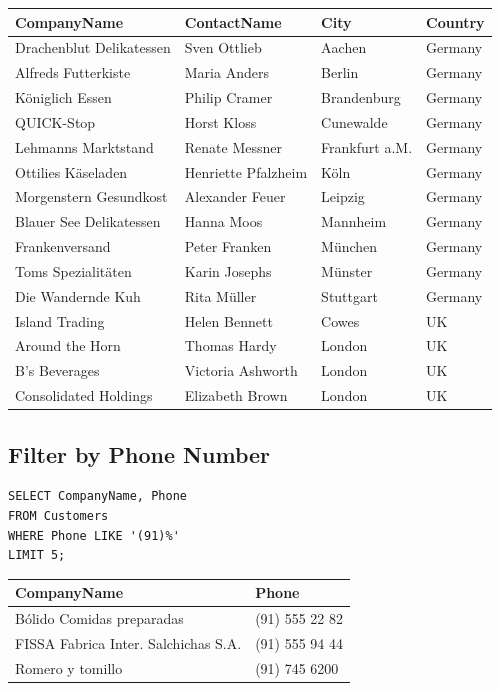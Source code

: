 \documentclass[10pt]{article}
\begin{document}
\begin{table}[H]
\begin{tabular}{|l|l|l|l|}
\hline
CompanyName	& ContactName	& City	& Country \\
\hline
Drachenblut Delikatessen	& Sven Ottlieb	& Aachen	& Germany \\
Alfreds Futterkiste	& Maria Anders	& Berlin	& Germany \\
Königlich Essen	& Philip Cramer	& Brandenburg	& Germany \\
QUICK-Stop	& Horst Kloss	& Cunewalde	& Germany \\
Lehmanns Marktstand	& Renate Messner	& Frankfurt a.M.	& Germany \\
Ottilies Käseladen	& Henriette Pfalzheim	& Köln	& Germany \\
Morgenstern Gesundkost	& Alexander Feuer	& Leipzig	& Germany \\
Blauer See Delikatessen	& Hanna Moos	& Mannheim	& Germany \\
Frankenversand	& Peter Franken	& München	& Germany \\
Toms Spezialitäten	& Karin Josephs	& Münster	& Germany \\
Die Wandernde Kuh	& Rita Müller	& Stuttgart	& Germany \\
Island Trading	& Helen Bennett	& Cowes	& UK \\
Around the Horn	& Thomas Hardy	& London	& UK \\
B's Beverages	& Victoria Ashworth	& London	& UK \\
Consolidated Holdings	& Elizabeth Brown	& London	& UK \\
\hline
\end{tabular}
\end{table}



\subsection{Filter by Phone Number}

\begin{verbatim}
SELECT CompanyName, Phone 
FROM Customers 
WHERE Phone LIKE '(91)%' 
LIMIT 5;
\end{verbatim}

\begin{table}[H]
\begin{tabular}{|l|l|}
\hline
CompanyName	& Phone \\
\hline
Bólido Comidas preparadas	& (91) 555 22 82 \\
FISSA Fabrica Inter. Salchichas S.A.	& (91) 555 94 44 \\
Romero y tomillo	& (91) 745 6200 \\
\hline
\end{tabular}
\end{table}
\end{document}

